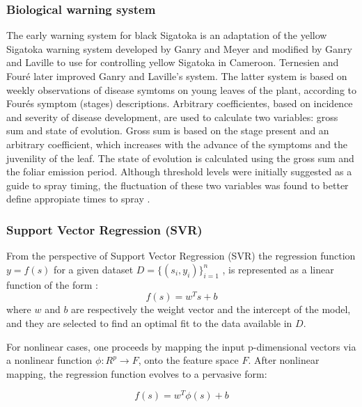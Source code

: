 \documentclass[review]{elsarticle}
\begin{document}
\subsubsection{Biological warning system}

The early warning system for black Sigatoka is an adaptation of the yellow Sigatoka warning system developed by Ganry and Meyer and modified by Ganry and Laville to use for controlling yellow Sigatoka in Cameroon. Ternesien and Fouré  later improved Ganry and Laville's system.
%
The latter system is based on weekly observations of disease symtoms on young leaves of the plant, according to Fourés symptom (stages) descriptions. Arbitrary coefficientes, based on incidence and severity of disease development, are used to calculate two variables: gross sum and state of evolution.
%
Gross sum is based on the stage present and an arbitrary coefficient, which increases with the advance of the symptoms and the juvenility of the leaf. The state of evolution is calculated using the gross sum and the foliar emission period.
%
Although threshold levels were initially suggested as a guide to spray timing, the fluctuation of these two variables was found to better define appropiate times to spray \citep{Marinetal2003}.

\subsubsection{Support Vector Regression (SVR)}
From the perspective of Support Vector Regression (SVR) the regression function $y = f(s)$ for a given dataset $D=\{(s_i,y_i)\}_{i=1}^n$ , is represented as a linear function of the form \citep{Wei2013}:
$$f(s)=w^Ts+b$$
where $w$ and $b$ are respectively the weight vector and the intercept of the model, and they are selected to find an optimal fit to the data available in $D$.

For nonlinear cases, one proceeds by mapping the input p-dimensional vectors via a nonlinear function $\phi : R^p\rightarrow F$, onto the feature space $F$.  After nonlinear mapping, the regression function evolves to a pervasive form:

$$f(s)=w^T \phi (s)+b$$
\end{document}
